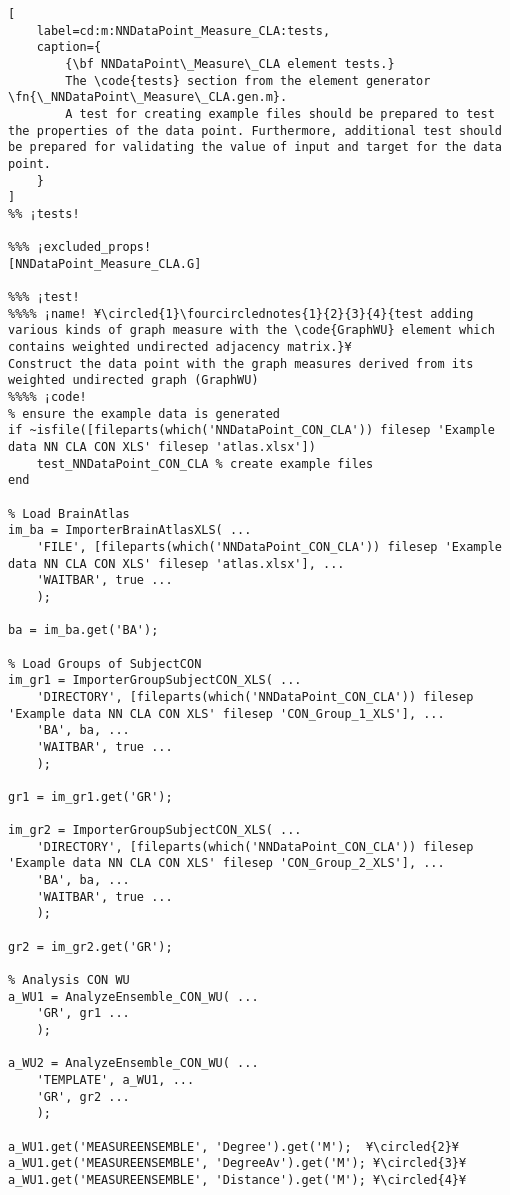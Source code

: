 \documentclass{tufte-handout}
\begin{document}
\begin{lstlisting}[
	label=cd:m:NNDataPoint_Measure_CLA:tests,
	caption={
		{\bf NNDataPoint\_Measure\_CLA element tests.}
		The \code{tests} section from the element generator \fn{\_NNDataPoint\_Measure\_CLA.gen.m}.
		A test for creating example files should be prepared to test the properties of the data point. Furthermore, additional test should be prepared for validating the value of input and target for the data point.
	}
]		
%% ¡tests!

%%% ¡excluded_props!
[NNDataPoint_Measure_CLA.G]

%%% ¡test!
%%%% ¡name! ¥\circled{1}\fourcirclednotes{1}{2}{3}{4}{test adding various kinds of graph measure with the \code{GraphWU} element which contains weighted undirected adjacency matrix.}¥
Construct the data point with the graph measures derived from its weighted undirected graph (GraphWU) 
%%%% ¡code!
% ensure the example data is generated
if ~isfile([fileparts(which('NNDataPoint_CON_CLA')) filesep 'Example data NN CLA CON XLS' filesep 'atlas.xlsx'])
    test_NNDataPoint_CON_CLA % create example files
end

% Load BrainAtlas
im_ba = ImporterBrainAtlasXLS( ...
    'FILE', [fileparts(which('NNDataPoint_CON_CLA')) filesep 'Example data NN CLA CON XLS' filesep 'atlas.xlsx'], ...
    'WAITBAR', true ...
    );

ba = im_ba.get('BA');

% Load Groups of SubjectCON
im_gr1 = ImporterGroupSubjectCON_XLS( ...
    'DIRECTORY', [fileparts(which('NNDataPoint_CON_CLA')) filesep 'Example data NN CLA CON XLS' filesep 'CON_Group_1_XLS'], ...
    'BA', ba, ...
    'WAITBAR', true ...
    );

gr1 = im_gr1.get('GR');

im_gr2 = ImporterGroupSubjectCON_XLS( ...
    'DIRECTORY', [fileparts(which('NNDataPoint_CON_CLA')) filesep 'Example data NN CLA CON XLS' filesep 'CON_Group_2_XLS'], ...
    'BA', ba, ...
    'WAITBAR', true ...
    );

gr2 = im_gr2.get('GR');

% Analysis CON WU
a_WU1 = AnalyzeEnsemble_CON_WU( ...
    'GR', gr1 ...
    );

a_WU2 = AnalyzeEnsemble_CON_WU( ...
    'TEMPLATE', a_WU1, ...
    'GR', gr2 ...
    );

a_WU1.get('MEASUREENSEMBLE', 'Degree').get('M');  ¥\circled{2}¥
a_WU1.get('MEASUREENSEMBLE', 'DegreeAv').get('M'); ¥\circled{3}¥
a_WU1.get('MEASUREENSEMBLE', 'Distance').get('M'); ¥\circled{4}¥


\end{lstlisting}
\end{document}
